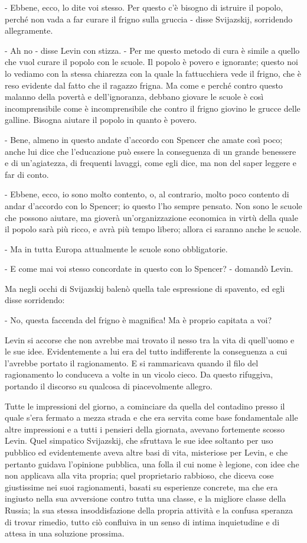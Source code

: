 - Ebbene, ecco, lo dite voi stesso. Per questo c'è bisogno di istruire il popolo, perché non vada a far curare il frigno sulla gruccia - disse Svijazskij, sorridendo allegramente. 

- Ah no - disse Levin con stizza. - Per me questo metodo di cura è simile a quello che vuol curare il popolo con le scuole. Il popolo è povero e ignorante; questo noi lo vediamo con la stessa chiarezza con la quale la fattucchiera vede il frigno, che è reso evidente dal fatto che il ragazzo frigna. Ma come e perché contro questo malanno della povertà e dell'ignoranza, debbano giovare le scuole è così incomprensibile come è incomprensibile che contro il frigno giovino le grucce delle galline. Bisogna aiutare il popolo in quanto è povero. 

- Bene, almeno in questo andate d'accordo con Spencer che amate così poco; anche lui dice che l'educazione può essere la conseguenza di un grande benessere e di un'agiatezza, di frequenti lavaggi, come egli dice, ma non del saper leggere e far di conto. 

- Ebbene, ecco, io sono molto contento, o, al contrario, molto poco contento di andar d'accordo con lo Spencer; io questo l'ho sempre pensato. Non sono le scuole che possono aiutare, ma gioverà un'organizzazione economica in virtù della quale il popolo sarà più ricco, e avrà più tempo libero; allora ci saranno anche le scuole. 

- Ma in tutta Europa attualmente le scuole sono obbligatorie. 

- E come mai voi stesso concordate in questo con lo Spencer? - domandò Levin. 

Ma negli occhi di Svijazskij balenò quella tale espressione di spavento, ed egli disse sorridendo: 

- No, questa faccenda del frigno è magnifica! Ma è proprio capitata a voi? 

Levin si accorse che non avrebbe mai trovato il nesso tra la vita di quell'uomo e le sue idee. Evidentemente a lui era del tutto indifferente la conseguenza a cui l'avrebbe portato il ragionamento. E si rammaricava quando il filo del ragionamento lo conduceva a volte in un vicolo cieco. Da questo rifuggiva, portando il discorso su qualcosa di piacevolmente allegro. 

Tutte le impressioni del giorno, a cominciare da quella del contadino presso il quale s'era fermato a mezza strada e che era servita come base fondamentale alle altre impressioni e a tutti i pensieri della giornata, avevano fortemente scosso Levin. Quel simpatico Svijazskij, che sfruttava le sue idee soltanto per uso pubblico ed evidentemente aveva altre basi di vita, misteriose per Levin, e che pertanto guidava l'opinione pubblica, una folla il cui nome è legione, con idee che non applicava alla vita propria; quel proprietario rabbioso, che diceva cose giustissime nei suoi ragionamenti, basati su esperienze concrete, ma che era ingiusto nella sua avversione contro tutta una classe, e la migliore classe della Russia; la sua stessa insoddisfazione della propria attività e la confusa speranza di trovar rimedio, tutto ciò confluiva in un senso di intima inquietudine e di attesa in una soluzione prossima. 

